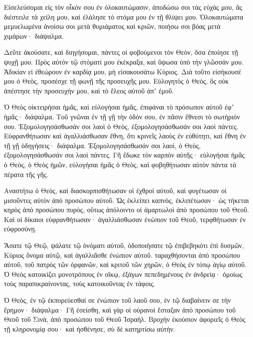 \begin{spacing}{1.1}
\begin{multicols}{2}
Εἰσελεύσομαι εἰς τὸν οἶκόν σου ἐν ὁλοκαυτώμασιν, ἀποδώσω σοι τὰς εὐχάς μου,
ἃς διέστειλε τὰ χείλη μου, καὶ ἐλάλησε τὸ στόμα μου ἐν τῇ θλίψει μου.
Ὁλοκαυτώματα μεμυελωμένα ἀνοίσω σοι μετὰ θυμιάματος καὶ κριῶν, ποιήσω σοι βόας μετὰ χιμάρων· διάψαλμα.

Δεῦτε ἀκούσατε, καὶ διηγήσομαι, πάντες οἱ φοβούμενοι τὸν Θεὸν, ὅσα ἐποίησε τῇ ψυχῇ μου.
Πρὸς αὐτὸν τῷ στόματί μου ἐκέκραξα, καὶ ὕψωσα ὑπὸ τὴν γλῶσσάν μου.
Ἀδικίαν εἰ ἐθεώρουν ἐν καρδίᾳ μου, μὴ εἰσακουσάτω Κύριος.
Διὰ τοῦτο εἰσήκουσέ μου ὁ Θεὸς, προσέσχε τῇ φωνῇ τῆς προσευχῆς μου.
Εὐλογητὸς ὁ Θεὸς, ὃς οὐκ ἀπέστησε τὴν προσευχήν μου, καὶ τὸ ἔλεος αὐτοῦ ἀπʼ ἐμοῦ.

Ὁ Θεὸς οἰκτειρήσαι ἡμᾶς, καὶ εὐλογήσαι ἡμᾶς, ἐπιφάναι τὸ πρόσωπον αὐτοῦ ἐφʼ ἡμᾶς· διάψαλμα.
Τοῦ γνῶναι ἐν τῇ γῇ τὴν ὁδόν σου, ἐν πᾶσιν ἔθνεσι τὸ σωτήριόν σου.
Ἐξομολογησάσθωσάν σοι λαοὶ ὁ Θεὸς, ἐξομολογησάσθωσάν σοι λαοὶ πάντες.
Εὐφρανθήτωσαν καὶ ἀγαλλιάσθωσαν ἔθνη, ὅτι κρινεῖς λαοὺς ἐν εὐθύτητι, καὶ ἔθνη ἐν τῇ γῇ ὁδηγήσεις· διάψαλμα.
Ἐξομολογησάσθωσάν σοι λαοὶ, ὁ Θεὸς, ἐξομολογησάσθωσάν σοι λαοὶ πάντες.
Γῆ ἔδωκε τὸν καρπὸν αὐτῆς· εὐλογήσαι ἡμᾶς ὁ Θεὸς, ὁ Θεὸς ἡμῶν,
εὐλογήσαι ἡμᾶς ὁ Θεὸς, καὶ φοβηθήτωσαν αὐτὸν πάντα τὰ πέρατα τῆς γῆς.

Αναστήτω ὁ Θεὸς, καὶ διασκορπισθήτωσαν οἱ ἐχθροὶ αὐτοῦ, καὶ φυγέτωσαν οἱ μισοῦντες αὐτὸν ἀπὸ προσώπου αὐτοῦ.
Ὡς ἐκλείπει καπνὸς, ἐκλιπέτωσαν· ὡς τήκεται κηρὸς ἀπὸ προσώπου πυρὸς, οὕτως ἀπόλοιντο οἱ ἁμαρτωλοὶ ἀπὸ προσώπου τοῦ Θεοῦ.
Καὶ οἱ δίκαιοι εὐφρανθήτωσαν· ἀγαλλιάσθωσαν ἐνώπιον τοῦ Θεοῦ, τερφθήτωσαν ἐν εὐφροσύνῃ.

Ἄσατε τῷ Θεῷ, ψάλατε τῷ ὀνόματι αὐτοῦ, ὁδοποιήσατε τῷ ἐπιβεβηκότι ἐπὶ δυσμῶν, Κύριος ὄνομα αὐτῷ, καὶ ἀγαλλιᾶσθε ἐνώπιον αὐτοῦ.
ταραχθήσονται ἀπὸ προσώπου αὐτοῦ, τοῦ πατρὸς τῶν ὀρφανῶν, καὶ κριτοῦ τῶν χηρῶν, ὁ Θεὸς ἐν τόπῳ ἁγίῳ αὐτοῦ.
Ὁ Θεὸς κατοικίζει μονοτρόπους ἐν οἴκῳ, ἐξάγων πεπεδημένους ἐν ἀνδρείᾳ· ὁμοίως τοὺς παραπικραίνοντας, τοὺς κατοικοῦντας ἐν τάφοις.

Ὁ Θεὸς, ἐν τῷ ἐκπορεύεσθαί σε ἐνώπιον τοῦ λαοῦ σου, ἐν τῷ διαβαίνειν σε τὴν ἔρημον· διάψαλμα·
Γῆ ἐσείσθη, καὶ γὰρ οἱ οὐρανοὶ ἔσταξαν ἀπὸ προσώπου τοῦ Θεοῦ τοῦ Σινὰ, ἀπὸ προσώπου τοῦ Θεοῦ Ἰσραήλ.
Βροχὴν ἑκούσιον ἀφοριεῖς ὁ Θεὸς τῇ κληρονομίᾳ σου· καὶ ἠσθένησε, σὺ δὲ κατηρτίσω αὐτήν.


\end{multicols}
\end{spacing}
